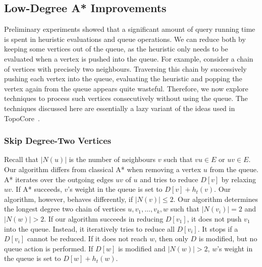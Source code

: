 \documentclass[manuscript,review]{acmart}
\begin{document}
\subsection{Low-Degree A* Improvements}\label{sec:low-deg-improvment}

Preliminary experiments showed that a significant amount of query running time is spent in heuristic evaluations and queue operations.
We can reduce both by keeping some vertices out of the queue, as the heuristic only needs to be evaluated when a vertex is pushed into the queue.
For example, consider a chain of vertices with precisely two neighbours.
Traversing this chain by successively pushing each vertex into the queue, evaluating the heuristic and popping the vertex again from the queue appears quite wasteful.
Therefore, we now explore techniques to process such vertices consecutively without using the queue.
The techniques discussed here are essentially a lazy variant of the ideas used in TopoCore~\cite{DBLP:conf/gis/DibbeltSW15}.


\subsubsection{Skip Degree-Two Vertices}

Recall that $|N(u)|$ is the number of neighbours $v$ such that $vu \in E$ or $uv \in E$.
Our algorithm differs from classical A* when removing a vertex $u$ from the queue.
A* iterates over the outgoing edges $uv$ of $u$ and tries to reduce $D[v]$ by relaxing $uv$.
If A* succeeds, $v$'s weight in the queue is set to $D[v]+h_t(v)$.
Our algorithm, however, behaves differently, if $|N(v)|\le 2$.
Our algorithm determines the longest degree two chain of vertices $u, v_1,\ldots, v_k, w$ such that $|N(v_i)|=2$ and $|N(w)| > 2$.
If our algorithm succeeds in reducing $D[v_1]$, it does not push $v_1$ into the queue.
Instead, it iteratively tries to reduce all $D[v_i]$.
It stops if a $D[v_i]$ cannot be reduced.
If it does not reach $w$, then only $D$ is modified, but no queue action is performed.
If $D[w]$ is modified and $|N(w)|>2$, $w$'s weight in the queue is set to $D[w]+h_t(w)$.
\end{document}
